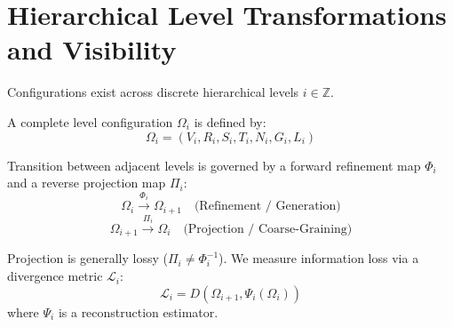 \section{Hierarchical Level Transformations and Visibility}
\label{sec:transformations}

Configurations exist across discrete hierarchical levels $i \in \mathbb{Z}$.

\begin{definition}
A complete level configuration $\Omega_i$ is defined by:
\begin{equation}
\Omega_i = (V_i, R_i, S_i, T_i, N_i, G_i, L_i)
\end{equation}
\end{definition}

Transition between adjacent levels is governed by a forward refinement map $\Phi_i$ and a reverse projection map $\Pi_i$:
\begin{equation}
\boxed{\Omega_i \xrightarrow{\Phi_i} \Omega_{i+1}} \quad \text{(Refinement / Generation)}
\end{equation}
\begin{equation}
\boxed{\Omega_{i+1} \xrightarrow{\Pi_i} \Omega_i} \quad \text{(Projection / Coarse-Graining)}
\end{equation}

Projection is generally lossy ($\Pi_i \neq \Phi_i^{-1}$). We measure information loss via a divergence metric $\mathcal{L}_i$:
\begin{equation}
\mathcal{L}_i = D\left(\Omega_{i+1}, \Psi_i(\Omega_i)\right)
\end{equation}
where $\Psi_i$ is a reconstruction estimator.
